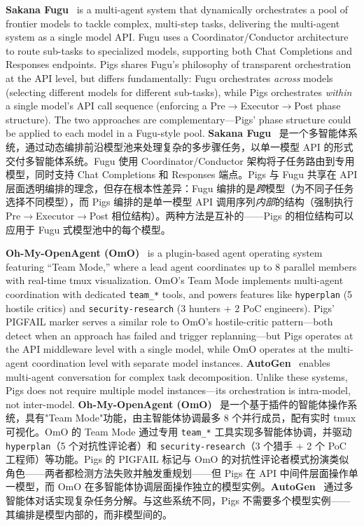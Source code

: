 \textbf{Sakana Fugu}~\citep{sakana2026fugu} is a multi-agent system that dynamically orchestrates a pool of frontier models to tackle complex, multi-step tasks, delivering the multi-agent system as a single model API. Fugu uses a Coordinator/Conductor architecture to route sub-tasks to specialized models, supporting both Chat Completions and Responses endpoints. Pigs shares Fugu's philosophy of transparent orchestration at the API level, but differs fundamentally: Fugu orchestrates \emph{across} models (selecting different models for different sub-tasks), while Pigs orchestrates \emph{within} a single model's API call sequence (enforcing a Pre$\rightarrow$Executor$\rightarrow$Post phase structure). The two approaches are complementary---Pigs' phase structure could be applied to each model in a Fugu-style pool.
\textbf{Sakana Fugu}~\citep{sakana2026fugu} 是一个多智能体系统，通过动态编排前沿模型池来处理复杂的多步骤任务，以单一模型 API 的形式交付多智能体系统。Fugu 使用 Coordinator/Conductor 架构将子任务路由到专用模型，同时支持 Chat Completions 和 Responses 端点。Pigs 与 Fugu 共享在 API 层面透明编排的理念，但存在根本性差异：Fugu 编排的是\emph{跨}模型（为不同子任务选择不同模型），而 Pigs 编排的是单一模型 API 调用序列\emph{内部}的结构（强制执行 Pre$\rightarrow$Executor$\rightarrow$Post 相位结构）。两种方法是互补的——Pigs 的相位结构可以应用于 Fugu 式模型池中的每个模型。

\textbf{Oh-My-OpenAgent (OmO)}~\citep{omo2026} is a plugin-based agent operating system featuring ``Team Mode,'' where a lead agent coordinates up to 8 parallel members with real-time tmux visualization. OmO's Team Mode implements multi-agent coordination with dedicated \texttt{team\_*} tools, and powers features like \texttt{hyperplan} (5 hostile critics) and \texttt{security-research} (3 hunters + 2 PoC engineers). Pigs' PIGFAIL marker serves a similar role to OmO's hostile-critic pattern---both detect when an approach has failed and trigger replanning---but Pigs operates at the API middleware level with a single model, while OmO operates at the multi-agent coordination level with separate model instances. \textbf{AutoGen}~\citep{wu2023autogen_multi} enables multi-agent conversation for complex task decomposition. Unlike these systems, Pigs does not require multiple model instances---its orchestration is intra-model, not inter-model.
\textbf{Oh-My-OpenAgent (OmO)}~\citep{omo2026} 是一个基于插件的智能体操作系统，具有"Team Mode"功能，由主智能体协调最多 8 个并行成员，配有实时 tmux 可视化。OmO 的 Team Mode 通过专用 \texttt{team\_*} 工具实现多智能体协调，并驱动 \texttt{hyperplan}（5 个对抗性评论者）和 \texttt{security-research}（3 个猎手 + 2 个 PoC 工程师）等功能。Pigs 的 PIGFAIL 标记与 OmO 的对抗性评论者模式扮演类似角色——两者都检测方法失败并触发重规划——但 Pigs 在 API 中间件层面操作单一模型，而 OmO 在多智能体协调层面操作独立的模型实例。\textbf{AutoGen}~\citep{wu2023autogen_multi} 通过多智能体对话实现复杂任务分解。与这些系统不同，Pigs 不需要多个模型实例——其编排是模型内部的，而非模型间的。

